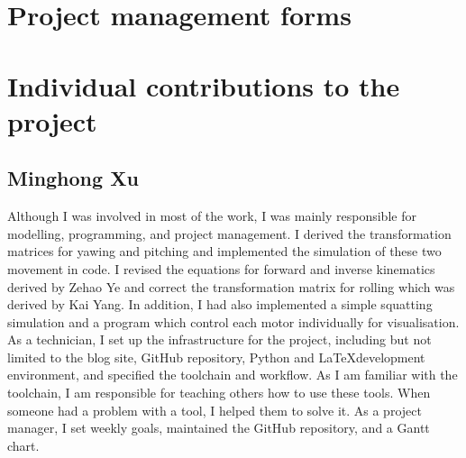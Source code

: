 \newpage
\appendix
\appendixpage
\addappheadtotoc


\chapter{Project management forms}









\chapter{Individual contributions to the project}

\section{Minghong Xu}
Although I was involved in most of the work, I was mainly responsible for modelling, programming, and project management. I derived the transformation matrices for yawing and pitching and implemented the simulation of these two movement in code. I revised the equations for forward and inverse kinematics derived by Zehao Ye and correct the transformation matrix for rolling which was derived by Kai Yang. In addition, I had also implemented a simple squatting simulation and a program which control each motor individually for visualisation. As a technician, I set up the infrastructure for the project, including but not limited to the blog site, GitHub repository, Python and \LaTeX development environment, and specified the toolchain and workflow. As I am familiar with the toolchain, I am responsible for teaching others how to use these tools. When someone had a problem with a tool, I helped them to solve it. As a project manager, I set weekly goals, maintained the GitHub repository, and a Gantt chart.

